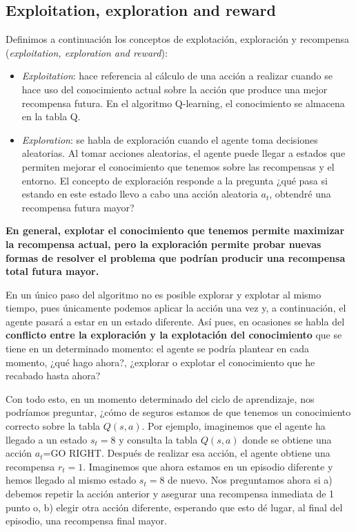 \documentclass{article}
\begin{document}
\subsection{Exploitation, exploration and reward}
Definimos a continuación los conceptos de explotación, exploración y recompensa (\textit{exploitation, exploration and reward}):
\begin{itemize}
    \item \textit{Exploitation}: hace referencia al cálculo de una acción a realizar cuando se hace uso del conocimiento actual sobre la acción que produce una mejor recompensa futura. En el algoritmo Q-learning, el conocimiento se almacena en la tabla Q. 
    
    \item \textit{Exploration}: se habla de exploración cuando el agente toma decisiones aleatorias. Al tomar acciones aleatorias, el agente puede llegar a estados que permiten mejorar el conocimiento que tenemos sobre las recompensas y el entorno. El concepto de exploración responde a la pregunta ¿qué pasa si estando en este estado llevo a cabo una acción aleatoria $a_t$, obtendré una recompensa futura mayor?
\end{itemize}

\textbf{En general, explotar el conocimiento que tenemos permite maximizar la recompensa actual, pero la exploración permite probar nuevas formas de resolver el problema que podrían producir una recompensa total futura mayor.}



En un único paso del algoritmo no es posible explorar y explotar al mismo tiempo, pues únicamente podemos aplicar la acción una vez y, a continuación, el agente pasará a estar en un estado diferente. Así pues, en ocasiones se habla del \textbf{conflicto entre la exploración y la explotación del conocimiento} que se tiene en un determinado momento: el agente se podría plantear en cada momento, ¿qué hago ahora?, ¿explorar o explotar el conocimiento que he recabado hasta ahora? 

Con todo esto, en un momento determinado del ciclo de aprendizaje, nos podríamos preguntar, ¿cómo de seguros estamos de que tenemos un conocimiento correcto sobre la tabla $Q(s,a)$. Por ejemplo, imaginemos que el agente ha llegado a un estado $s_t=8$ y consulta la tabla $Q(s,a)$ donde se obtiene una acción $a_t$=GO RIGHT. Después de realizar esa acción, el agente obtiene una recompensa $r_t=1$. Imaginemos que ahora estamos en un episodio diferente y hemos llegado al mismo estado $s_t=8$ de nuevo. Nos preguntamos ahora si a) debemos repetir la acción anterior y asegurar una recompensa inmediata de 1 punto o, b) elegir otra acción diferente, esperando que esto dé lugar, al final del episodio, una recompensa final mayor.
\end{document}
